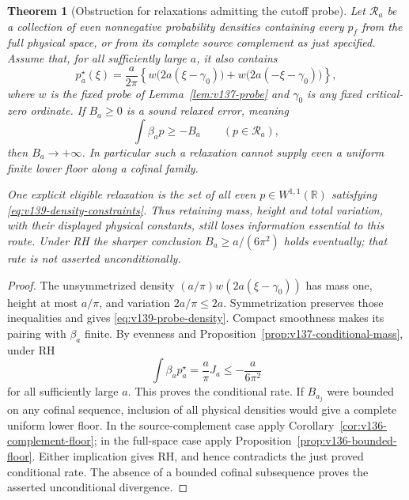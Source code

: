 \documentclass[11pt]{article}
\newtheorem{theorem}{Theorem}[section]
\theoremstyle{remark}
\begin{document}
\begin{theorem}[Obstruction for relaxations admitting the cutoff probe]
\label{thm:v139-probe-relaxation}
Let $\mathcal R_a$ be a collection of even nonnegative probability
densities containing every $p_f$ from the full physical space, or
from its complete source complement as just specified. Assume that,
for all sufficiently large $a$, it also contains
\begin{equation}\label{eq:v139-probe-density}
 p_a^\star(\xi)=\frac a{2\pi}
 \left\{w\bigl(2a(\xi-\gamma_0)\bigr)
       +w\bigl(2a(-\xi-\gamma_0)\bigr)\right\},
\end{equation}
where $w$ is the fixed probe of Lemma~\ref{lem:v137-probe} and
$\gamma_0$ is any fixed critical-zero ordinate. If $B_a\ge0$ is a
sound relaxed error, meaning
\begin{equation}\label{eq:v139-relaxed-error}
 \int\beta_a p\ge-B_a\qquad(p\in\mathcal R_a),
\end{equation}
then $B_a\to+\infty$. In particular such a relaxation cannot supply
even a uniform finite lower floor along a cofinal family.

One explicit eligible relaxation is the set of all even $p\in
W^{1,1}(\mathbb R)$ satisfying \eqref{eq:v139-density-constraints}.
Thus retaining mass, height and total variation, with their displayed
physical constants, still loses information essential to this route.
Under RH the sharper conclusion $B_a\ge a/(6\pi^2)$ holds eventually;
that rate is not asserted unconditionally.
\end{theorem}
\begin{proof}
The unsymmetrized density $(a/\pi)w(2a(\xi-\gamma_0))$ has mass one,
height at most $a/\pi$, and variation $2a/\pi\le2a$.
Symmetrization preserves those inequalities and gives
\eqref{eq:v139-probe-density}. Compact smoothness makes its pairing
with $\beta_a$ finite. By evenness and
Proposition~\ref{prop:v137-conditional-mass}, under RH
\[
 \int\beta_ap_a^\star=\frac a\pi J_a
       \le-\frac a{6\pi^2}
\]
for all sufficiently large $a$. This proves the conditional rate.
If $B_{a_j}$ were bounded on any cofinal sequence, inclusion of all
physical densities would give a complete uniform lower floor. In
the source-complement case apply
Corollary~\ref{cor:v136-complement-floor}; in the full-space case
apply Proposition~\ref{prop:v136-bounded-floor}. Either implication
gives RH, and hence contradicts the just proved conditional rate.
The absence of a bounded cofinal subsequence proves the asserted
unconditional divergence.
\end{proof}
\end{document}
